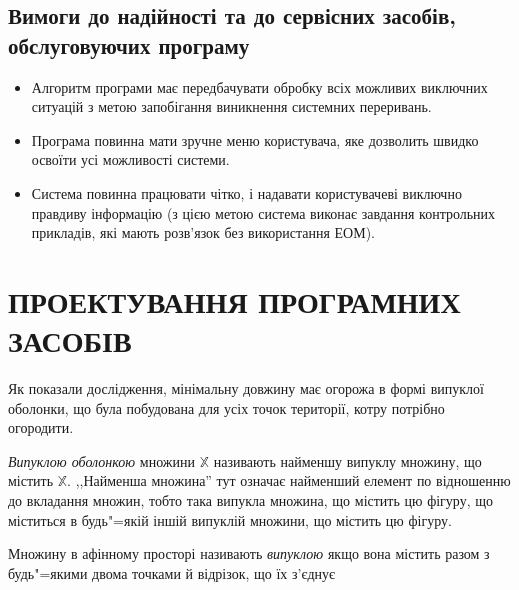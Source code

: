 \documentclass[simple,14pt,utf8,ukrainian]{eskdtext}
\begin{document}
    \subsection*{Вимоги до надійності та до сервісних засобів, обслуговуючих
    програму}
      \begin{itemize}
        \item Алгоритм програми має передбачувати обробку всіх можливих
          виключних ситуацій з метою запобігання виникнення системних
          переривань.
        \item Програма повинна мати зручне меню користувача, яке дозволить
          швидко освоїти усі можливості системи.
        \item Система повинна працювати чітко, і надавати користувачеві
          виключно правдиву інформацію (з цією метою система виконає завдання
          контрольних прикладів, які мають розв’язок без використання ЕОМ).
      \end{itemize}

\section{ПРОЕКТУВАННЯ ПРОГРАМНИХ ЗАСОБІВ}
  Як показали дослідження, мінімальну довжину має огорожа в формі випуклої
  оболонки, що була побудована для усіх точок території, котру потрібно
  огородити.\cite{book1}

  \emph{Випуклою оболонкою} множини $\mathbb{X}$ називають найменшу випуклу
  множину, що містить $\mathbb{X}$.
  ,,Найменша множина'' тут означає найменший елемент по відношенню до
  вкладання множин, тобто така випукла множина, що містить цю фігуру, що
  міститься в будь"=якій іншій випуклій множини, що містить цю фігуру.\cite{book2}

  Множину в афінному просторі називають \emph{випуклою} якщо вона містить
  разом з будь"=якими двома точками й відрізок, що їх з’єднує
\end{document}
